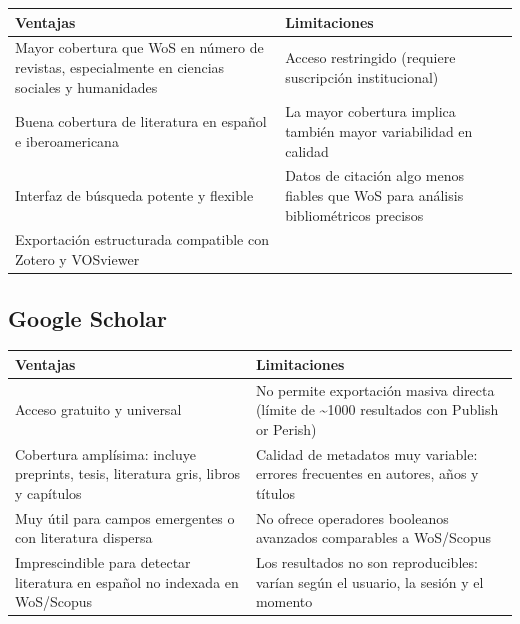 \documentclass[
]{book}
\newcounter{none} %
\begin{document}
{\def\LTcaptype{none} %
\begin{longtable}[]{@{}
  >{\raggedright\arraybackslash}p{}
  >{\raggedright\arraybackslash}p{}@{}}
\toprule\noalign{}
\begin{minipage}[b]{\linewidth}\raggedright
Ventajas
\end{minipage} & \begin{minipage}[b]{\linewidth}\raggedright
Limitaciones
\end{minipage} \\
\midrule\noalign{}
\endhead
\bottomrule\noalign{}
\endlastfoot
Mayor cobertura que WoS en número de revistas, especialmente en ciencias sociales y humanidades & Acceso restringido (requiere suscripción institucional) \\
Buena cobertura de literatura en español e iberoamericana & La mayor cobertura implica también mayor variabilidad en calidad \\
Interfaz de búsqueda potente y flexible & Datos de citación algo menos fiables que WoS para análisis bibliométricos precisos \\
Exportación estructurada compatible con Zotero y VOSviewer & \\
\end{longtable}
}

\subsection{Google Scholar}\label{google-scholar}

{\def\LTcaptype{none} %
\begin{longtable}[]{@{}
  >{\raggedright\arraybackslash}p{}
  >{\raggedright\arraybackslash}p{}@{}}
\toprule\noalign{}
\begin{minipage}[b]{\linewidth}\raggedright
Ventajas
\end{minipage} & \begin{minipage}[b]{\linewidth}\raggedright
Limitaciones
\end{minipage} \\
\midrule\noalign{}
\endhead
\bottomrule\noalign{}
\endlastfoot
Acceso gratuito y universal & No permite exportación masiva directa (límite de \textasciitilde1000 resultados con Publish or Perish) \\
Cobertura amplísima: incluye preprints, tesis, literatura gris, libros y capítulos & Calidad de metadatos muy variable: errores frecuentes en autores, años y títulos \\
Muy útil para campos emergentes o con literatura dispersa & No ofrece operadores booleanos avanzados comparables a WoS/Scopus \\
Imprescindible para detectar literatura en español no indexada en WoS/Scopus & Los resultados no son reproducibles: varían según el usuario, la sesión y el momento \\
\end{longtable}
}
\end{document}
